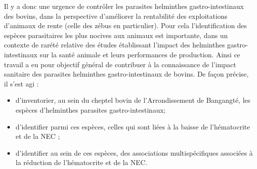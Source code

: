 \par Il y a donc une urgence de contrôler les parasites helminthes gastro-intestinaux des bovins, dans la perspective d’améliorer la rentabilité des exploitations d’animaux de rente (celle des zébus en particulier). Pour cela l'identification des espèces parasitaires les plus nocives aux animaux est importante, dans un contexte de rarété relative des études établissant l'impact des helminthes gastro-intestinaux sur la santé animale et leurs performances de production. Ainsi ce travail a eu pour objectif général de contribuer à la connaissance de l'impact sanitaire des parasites helminthes gastro-intestinaux de bovins. De façon précise, il s'est agi :
\begin{itemize}
\item d’inventorier, au sein du cheptel bovin de l'Arrondissement de Bangangté, les espèces d’helminthes parasites gastro-intestinaux;
\item d’identifier parmi ces espèces, celles qui sont liées à la baisse de l'hématocrite et de la NEC ;
\item d’identifier au sein de ces espèces, des associations multispécifiques associées à la réduction de l'hématocrite et de la NEC.
\end{itemize}